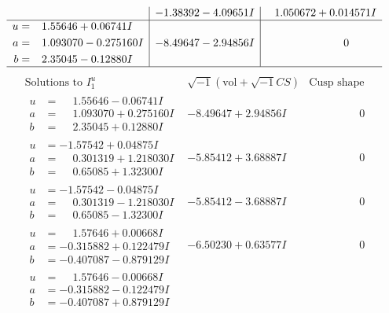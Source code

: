 \documentclass[1p]{elsarticle_modified}
\theoremstyle{definition}
\newcommand{\I}{\sqrt{-1}}
\begin{document}
$$\begin{array}{c|c|c}
 & -1.38392 - 4.09651 I & \phantom{-}1.050672 + 0.014571 I \\ \hline\begin{aligned}
u &= \phantom{-}1.55646 + 0.06741 I \\
a &= \phantom{-}1.093070 - 0.275160 I \\
b &= \phantom{-}2.35045 - 0.12880 I\end{aligned}
 & -8.49647 - 2.94856 I & \phantom{-0.000000 } 0\\
 \hline 
 \end{array}$$\newpage$$\begin{array}{c|c|c}  
\text{Solutions to }I^u_{1}& \I (\text{vol} + \sqrt{-1}CS) & \text{Cusp shape}\\
 \hline 
\begin{aligned}
u &= \phantom{-}1.55646 - 0.06741 I \\
a &= \phantom{-}1.093070 + 0.275160 I \\
b &= \phantom{-}2.35045 + 0.12880 I\end{aligned}
 & -8.49647 + 2.94856 I & \phantom{-0.000000 } 0 \\ \hline\begin{aligned}
u &= -1.57542 + 0.04875 I \\
a &= \phantom{-}0.301319 + 1.218030 I \\
b &= \phantom{-}0.65085 + 1.32300 I\end{aligned}
 & -5.85412 + 3.68887 I & \phantom{-0.000000 } 0 \\ \hline\begin{aligned}
u &= -1.57542 - 0.04875 I \\
a &= \phantom{-}0.301319 - 1.218030 I \\
b &= \phantom{-}0.65085 - 1.32300 I\end{aligned}
 & -5.85412 - 3.68887 I & \phantom{-0.000000 } 0 \\ \hline\begin{aligned}
u &= \phantom{-}1.57646 + 0.00668 I \\
a &= -0.315882 + 0.122479 I \\
b &= -0.407087 - 0.879129 I\end{aligned}
 & -6.50230 + 0.63577 I & \phantom{-0.000000 } 0 \\ \hline\begin{aligned}
u &= \phantom{-}1.57646 - 0.00668 I \\
a &= -0.315882 - 0.122479 I \\
b &= -0.407087 + 0.879129 I\end{aligned}

\end{array}$$
\end{document}
